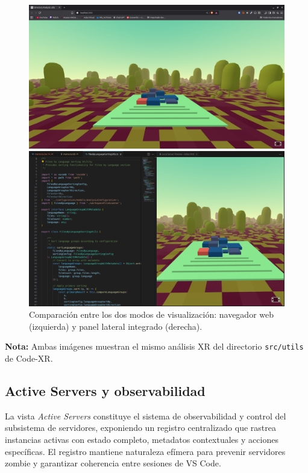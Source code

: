 \documentclass[a4paper, 12pt]{book}
\begin{document}
\begin{figure}[H]
\centering
\begin{minipage}[b]{0.48\textwidth}
\centering
\includegraphics[width=\textwidth]{img/browser-mode.png}
\end{minipage}
\hfill
\begin{minipage}[b]{0.48\textwidth}
\centering
\includegraphics[width=\textwidth]{img/panel-mode.png}
\end{minipage}
\caption{Comparación entre los dos modos de visualización: navegador web (izquierda) y panel lateral integrado (derecha).}
\label{fig:visualization-modes}
\end{figure}
\textbf{Nota:} Ambas imágenes muestran el mismo análisis XR del directorio \texttt{src/utils} de Code-XR.

\subsection{Active Servers y observabilidad}
La vista \emph{Active Servers} constituye el sistema de observabilidad y control del subsistema de servidores, exponiendo un registro centralizado que rastrea instancias activas con estado completo, metadatos contextuales y acciones específicas. El registro mantiene naturaleza efímera para prevenir servidores zombie y garantizar coherencia entre sesiones de VS Code.
\end{document}
